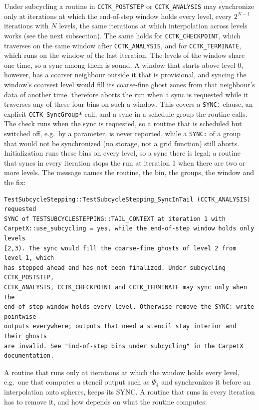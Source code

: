 Under subcycling a routine in \texttt{CCTK\_POSTSTEP} or \texttt{CCTK\_ANALYSIS} may synchronize only at iterations at which the end-of-step window holds every level, every $2^{N-1}$ iterations with $N$ levels, the same iterations at which interpolation across levels works (see the next subsection). The same holds for \texttt{CCTK\_CHECKPOINT}, which \CarpetX\space traverses on the same window after \texttt{CCTK\_ANALYSIS}, and for \texttt{CCTK\_TERMINATE}, which runs on the window of the last iteration. The levels of the window share one time, so a sync among them is sound. A window that starts above level 0, however, has a coarser neighbour outside it that is provisional, and syncing the window's coarsest level would fill its coarse-fine ghost zones from that neighbour's data of another time. \CarpetX\space therefore aborts the run when a sync is requested while it traverses any of these four bins on such a window. This covers a \texttt{SYNC:} clause, an explicit \texttt{CCTK\_SyncGroup*} call, and a sync in a schedule group the routine calls. The check runs when the sync is requested, so a routine that is scheduled but switched off, e.g.\ by a parameter, is never reported, while a \texttt{SYNC:} of a group that would not be synchronized (no storage, not a grid function) still aborts. Initialization runs these bins on every level, so a sync there is legal; a routine that syncs in every iteration stops the run at iteration 1 when there are two or more levels. The message names the routine, the bin, the groups, the window and the fix:
%
\begin{lstlisting}
TestSubcycleStepping::TestSubcycleStepping_SyncInTail (CCTK_ANALYSIS) requested
SYNC of TESTSUBCYCLESTEPPING::TAIL_CONTEXT at iteration 1 with
CarpetX::use_subcycling = yes, while the end-of-step window holds only levels
[2,3). The sync would fill the coarse-fine ghosts of level 2 from level 1, which
has stepped ahead and has not been finalized. Under subcycling CCTK_POSTSTEP,
CCTK_ANALYSIS, CCTK_CHECKPOINT and CCTK_TERMINATE may sync only when the
end-of-step window holds every level. Otherwise remove the SYNC: write pointwise
outputs everywhere; outputs that need a stencil stay interior and their ghosts
are invalid. See "End-of-step bins under subcycling" in the CarpetX
documentation.
\end{lstlisting}
%
A routine that runs only at iterations at which the window holds every level, e.g.\ one that computes a stencil output such as $\Psi_4$ and synchronizes it before an interpolation onto spheres, keeps its SYNC. A routine that runs in every iteration has to remove it, and how depends on what the routine computes:
